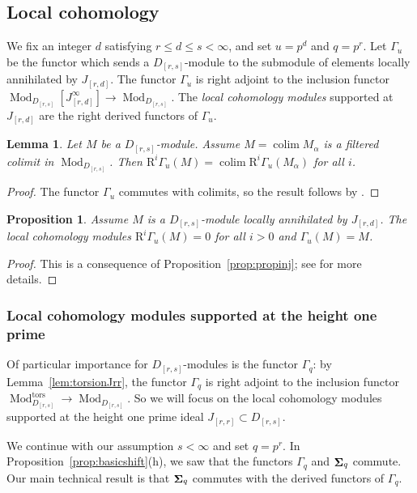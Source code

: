 \documentclass[12pt]{amsart}
\newcommand{\rR}{\mathrm{R}}
\DeclareMathOperator{\Mod}{Mod}
\newcommand{\tors}{\mathrm{tors}}
\DeclareMathOperator{\Sh}{\bf{\Sigma}}
\DeclareMathOperator{\colim}{colim}
\newcommand{\Drs}{D_{[r,s]}}
\newcommand{\Jrd}{J_{[r,d]}}
\newcommand{\Jrr}{J_{[r,r]}}
\newcommand{\mShq}{\Sh_{q}}
\newcommand{\mGaq}{\Gamma_{q}}
\newcommand{\mGau}{\Gamma_{u}}
\numberwithin{equation}{section}
\newtheorem{proposition}[equation]{Proposition}
\newtheorem{lemma}[equation]{Lemma}
\theoremstyle{definition}
\theoremstyle{plain}
\begin{document}
\subsection{Local cohomology}\label{ss:lcprelim}
We fix an integer $d$ satisfying $r \leq d \leq s < \infty$, and set $u = p^d$ and $q = p^r$. Let $\mGau$ be the functor which sends a $\Drs$-module to the submodule of elements locally annihilated by $\Jrd$. The functor $\mGau$ is right adjoint to the inclusion functor $\Mod_{\Drs}[\Jrd^{\infty}] \to \Mod_{\Drs}$. The \textit{local cohomology modules} supported at $\Jrd$ are the right derived functors of $\mGau$. 

\begin{lemma}\label{lem:lccolim}
    Let $M$ be a $\Drs$-module. Assume $M = \colim M_{\alpha}$ is a filtered colimit in $\Mod_{\Drs}$. Then $\rR^i\mGau(M) = \colim \rR^i\mGau(M_{\alpha})$ for all $i$.
\end{lemma}
\begin{proof}
The functor $\mGau$ commutes with colimits, so the result follows by \cite[Proposition~A.4]{gs18incmon}.
\end{proof}


\begin{proposition}\label{prop:torsionlc}
    Assume $M$ is a $\Drs$-module locally annihilated by $\Jrd$. The local cohomology modules $\rR^i\mGau(M) = 0$ for all $i > 0$ and $\mGau(M) = M$.
\end{proposition}
\begin{proof}
This is a consequence of Proposition~\ref{prop:propinj}; see \cite[Section~4]{ss19gl2} for more details. 
\end{proof}

\subsubsection*{Local cohomology modules supported at the height one prime}
Of particular importance for $\Drs$-modules is the functor $\mGaq$: by Lemma~\ref{lem:torsionJrr}, the functor $\mGaq$ is right adjoint to the inclusion functor $\Mod_{\Drs}^{\tors} \to \Mod_{\Drs}$.  So we will focus on the local cohomology modules supported at the height one prime ideal $\Jrr \subset \Drs$. 

We continue with our assumption $s < \infty$ and set $q = p^r$. In Proposition~\ref{prop:basicshift}(h), we saw that the functors $\mGaq$ and $\mShq$ commute. Our main technical result is that $\mShq$ commutes with the derived functors of $\mGaq$. 
\end{document}
